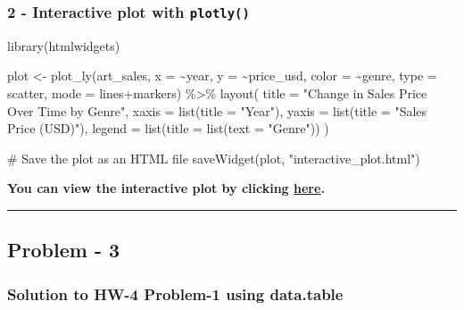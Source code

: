 \documentclass[
  12pt,
]{article}
\newenvironment{Shaded}{\begin{snugshade}}{\end{snugshade}}
\newcommand{\AttributeTok}[1]{\textcolor[rgb]{0.40,0.45,0.13}{#1}}
\newcommand{\CommentTok}[1]{\textcolor[rgb]{0.37,0.37,0.37}{#1}}
\newcommand{\FunctionTok}[1]{\textcolor[rgb]{0.28,0.35,0.67}{#1}}
\newcommand{\NormalTok}[1]{\textcolor[rgb]{0.00,0.23,0.31}{#1}}
\newcommand{\OtherTok}[1]{\textcolor[rgb]{0.00,0.23,0.31}{#1}}
\newcommand{\SpecialCharTok}[1]{\textcolor[rgb]{0.37,0.37,0.37}{#1}}
\newcommand{\StringTok}[1]{\textcolor[rgb]{0.13,0.47,0.30}{#1}}
\begin{document}
\subsubsection{\texorpdfstring{2 - Interactive plot with
\texttt{plotly()}}{2 - Interactive plot with plotly()}}\label{interactive-plot-with-plotly}

\begin{Shaded}
\begin{Highlighting}[]
\FunctionTok{library}\NormalTok{(htmlwidgets)}
  
\NormalTok{plot }\OtherTok{\textless{}{-}} \FunctionTok{plot\_ly}\NormalTok{(art\_sales, }\AttributeTok{x =} \SpecialCharTok{\textasciitilde{}}\NormalTok{year, }\AttributeTok{y =} \SpecialCharTok{\textasciitilde{}}\NormalTok{price\_usd, }\AttributeTok{color =} \SpecialCharTok{\textasciitilde{}}\NormalTok{genre, }\AttributeTok{type =} \StringTok{\textquotesingle{}scatter\textquotesingle{}}\NormalTok{, }\AttributeTok{mode =} \StringTok{\textquotesingle{}lines+markers\textquotesingle{}}\NormalTok{) }\SpecialCharTok{\%\textgreater{}\%}
  \FunctionTok{layout}\NormalTok{(}
    \AttributeTok{title =} \StringTok{"Change in Sales Price Over Time by Genre"}\NormalTok{,}
    \AttributeTok{xaxis =} \FunctionTok{list}\NormalTok{(}\AttributeTok{title =} \StringTok{"Year"}\NormalTok{),}
    \AttributeTok{yaxis =} \FunctionTok{list}\NormalTok{(}\AttributeTok{title =} \StringTok{"Sales Price (USD)"}\NormalTok{),}
    \AttributeTok{legend =} \FunctionTok{list}\NormalTok{(}\AttributeTok{title =} \FunctionTok{list}\NormalTok{(}\AttributeTok{text =} \StringTok{"Genre"}\NormalTok{))}
\NormalTok{  )}

\CommentTok{\# Save the plot as an HTML file}
\FunctionTok{saveWidget}\NormalTok{(plot, }\StringTok{"interactive\_plot.html"}\NormalTok{)}
\end{Highlighting}
\end{Shaded}

\textbf{You can view the interactive plot by clicking
\href{./interactive_plot.html}{here}.}

\hfill\break

\begin{center}\rule{0.5\linewidth}{0.5pt}\end{center}

\subsection{Problem - 3}\label{problem---3}

\subsubsection{Solution to HW-4 Problem-1 using
data.table}\label{solution-to-hw-4-problem-1-using-data.table}
\end{document}

